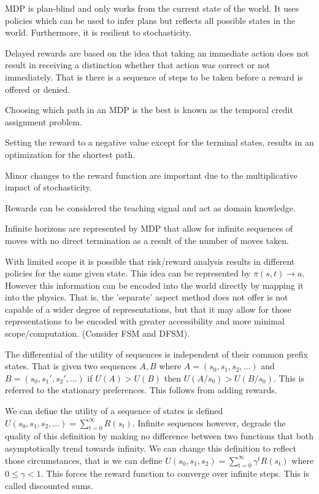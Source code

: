 \documentclass{article}
\begin{document}
MDP is plan-blind and only works from the current state of the world. It uses
policies which can be used to infer plans but reflects all possible states in
the world. Furthermore, it is resilient to stochasticity.

Delayed rewards are based on the idea that taking an immediate action does not
result in receiving a distinction whether that action was correct or not
immediately. That is there is a sequence of steps to be taken before a reward is
offered or denied.

Choosing which path in an MDP is the best is known as the temporal credit
assignment problem.

Setting the reward to a negative value except for the terminal states, results
in an optimization for the shortest path.

Minor changes to the reward function are important due to the multiplicative
impact of stochasticity.

Rewards can be considered the teaching signal and act as domain knowledge.

Infinite horizons are represented by MDP that allow for infinite sequences of
moves with no direct termination as a result of the number of moves taken.

With limited scope it is possible that risk/reward analysis results in different
policies for the same given state. This idea can be represented by $\pi(s,t)
\rightarrow a$. However this information can be encoded into the world directly
by mapping it into the physics. That is, the 'separate' aspect method does not
offer is not capable of a wider degree of representations, but that it may allow
for those representations to be encoded with greater accessibility and more
minimal scope/computation. (Consider FSM and DFSM).

The differential of the utility of sequences is independent of their common
prefix states. That is given two sequences $A, B$ where $A = (s_0, s_1, s_2,
\ldots)$ and $B = (s_0, s_1', s_2', \ldots)$ if $U(A) > U(B)$ then $U(A/s_0) >
U(B/s_0)$. This is referred to the stationary preferences. This follows from
adding rewards.

We can define the utility of a sequence of states is defined $U(s_0, s_1, s_2,
\ldots) = \sum_{t = 0}^\infty R(s_t)$. Infinite sequences however, degrade the
quality of this definition by making no difference between two functions that
both asymptotically trend towards infinity. We can change this definition to
reflect those circumstances, that is we can define $U(s_0, s_1, s_2) =
\sum_{t = 0}^\infty \gamma^tR(s_t)$ where $0 \leq \gamma < 1$. This forces the
reward function to converge over infinite steps. This is called discounted sums.
\end{document}
